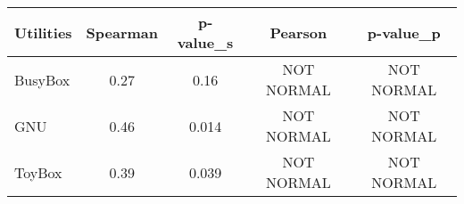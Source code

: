 \begin{tabular}{l| c c c c}
\toprule
 Utilities & Spearman & p-value_s & Pearson & p-value_p \\

\midrule
BusyBox & 0.27 & 0.16 & NOT NORMAL & NOT NORMAL \\
GNU & 0.46 & 0.014 & NOT NORMAL & NOT NORMAL \\
ToyBox & 0.39 & 0.039 & NOT NORMAL & NOT NORMAL \\
\bottomrule
\end{tabular}
